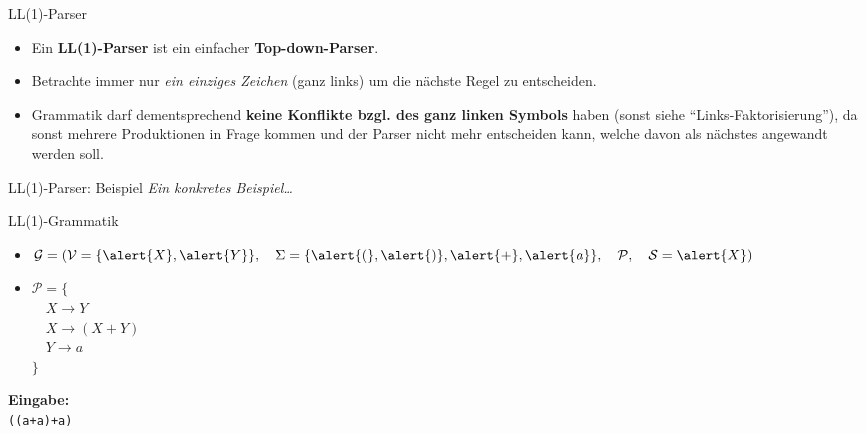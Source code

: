 \documentclass[18pt]{beamer}
\newcommand{\quotes}[1]{``#1''}
\begin{document}
\begin{frame}{LL(1)-Parser}
    \begin{itemize}
        \item Ein \textbf{LL(1)-Parser} ist ein einfacher \textbf{Top-down-Parser}.
        \item Betrachte immer nur \textit{ein einziges Zeichen} (ganz links) um die nächste Regel zu entscheiden.
        \item Grammatik darf dementsprechend \textbf{keine Konflikte bzgl. des ganz linken Symbols} haben (sonst siehe \quotes{Links-Faktorisierung}),
        da sonst mehrere Produktionen in Frage kommen und der Parser nicht mehr entscheiden kann, welche davon als nächstes angewandt werden soll.
    \end{itemize}
\end{frame}

\begin{frame}{LL(1)-Parser: Beispiel}
    \textit{Ein konkretes Beispiel\dots}
    \begin{exampleblock}{LL(1)-Grammatik}
        \begin{itemize}
            \item $\mathcal{G} = (\mathcal{V} = \{\alert{X}, \alert{Y}\}, \quad \Sigma = \{\alert{(}, \alert{)}, \alert{+}, \alert{\mathit{a}}\}, \quad \mathcal{P}, \quad \mathcal{S} = \alert{X})$
            \item $\mathcal{P} = \{$\\
            $\quad X \longrightarrow Y$\\
            $\quad X \longrightarrow (X+Y)$\\
            $\quad Y \longrightarrow \mathit{a}$\\
            $\}$
        \end{itemize}
    \end{exampleblock}
    \vspace{.2in}
    \textbf{Eingabe:}\\
    \vspace{.1in}
    \texttt{((a+a)+a)}\\
\end{frame}
\end{document}
